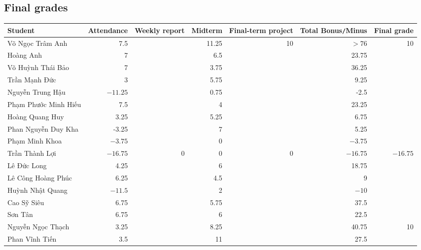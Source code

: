 \documentclass{article}
\begin{document}

\subsection{Final grades}

\begin{table}[H]
    \centering
    \begin{tabular}{|l|r|r|r|r|r|r|}
        \hline
        Student & Attendance & Weekly report & Midterm & Final-term project & Total Bonus{\tt/}Minus & Final grade \\
        \hline
        {\sc Võ Ngọc Trâm Anh} & 7.5 &  & 11.25 & 10 & $> 76$ &  10 \\
        \hline
        {\sc Hoàng Anh} & 7 &  & 6.5 &  & 23.75 &  \\
        \hline
        {\sc Võ Huỳnh Thái Bảo} & 7 &  & 3.75 &  & 36.25 &  \\
        \hline
        {\sc Trần Mạnh Đức} & 3 &  & 5.75 &  & 9.25 &  \\
        \hline
        {\sc Nguyễn Trung Hậu} & $-11.25$ &  & 0.75 &  & -2.5 &  \\
        \hline
        {\sc Phạm Phước Minh Hiếu} & 7.5 &  & 4 &  & 23.25 &  \\
        \hline
        {\sc Hoàng Quang Huy} & 3.25 &  & 5.25 &  & 6.75 &  \\
        \hline
        {\sc Phan Nguyễn Duy Kha} & -3.25 &  & 7 &  & 5.25 &  \\
        \hline
        {\sc Phạm Minh Khoa} & $-3.75$ &  & 0 &  & $-3.75$ &  \\
        \hline
        {\sc Trần Thành Lợi} & $-16.75$ & 0 & 0 & 0 & $-16.75$ & $-16.75$ \\
        \hline
        {\sc Lê Đức Long} & 4.25 &  & 6 &  & 18.75 &  \\
        \hline
        {\sc Lê Công Hoàng Phúc} & 6.25 & & 4.5 &  & 9 &  \\
        \hline
        {\sc Huỳnh Nhật Quang} & $-11.5$ &  & 2 &  & $-10$ &  \\
        \hline
        {\sc Cao Sỹ Siêu} & 6.75 &  & 5.75 &  & 37.5 &  \\
        \hline
        {\sc Sơn Tân} & 6.75 &  & 6 &  & 22.5 &  \\
        \hline
        {\sc Nguyễn Ngọc Thạch} & 3.25 &  & 8.25 &  & 40.75 & 10 \\
        \hline
        {\sc Phan Vĩnh Tiến} & 3.5 &  & 11 &  & 27.5 &  \\
        \hline
    \end{tabular}
\end{table}

\end{document}
